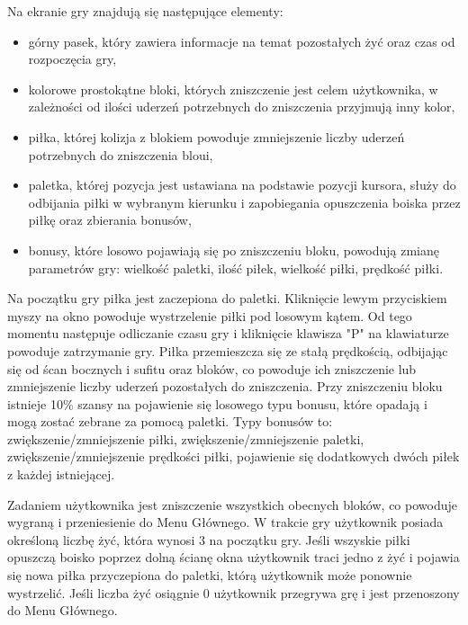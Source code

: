 \documentclass[a4paper]{article}
\begin{document}
Na ekranie gry znajdują się następujące elementy:
\begin{itemize}
\item górny pasek, który zawiera informacje na temat pozostałych żyć oraz czas od rozpoczęcia gry,
\item kolorowe prostokątne bloki, których zniszczenie jest celem użytkownika, w zależności od ilości uderzeń potrzebnych do zniszczenia przyjmują inny kolor,
\item piłka, której kolizja z blokiem powoduje zmniejszenie liczby uderzeń potrzebnych do zniszczenia bloui,
\item paletka, której pozycja jest ustawiana na podstawie pozycji kursora, służy do odbijania piłki w wybranym kierunku i zapobiegania opuszczenia boiska przez piłkę oraz zbierania bonusów,
\item bonusy, które losowo pojawiają się po zniszczeniu bloku, powodują zmianę parametrów gry: wielkość paletki, ilość piłek, wielkość piłki, prędkość piłki.
\end{itemize}

Na początku gry piłka jest zaczepiona do paletki. Kliknięcie lewym przyciskiem myszy na okno powoduje wystrzelenie piłki pod losowym kątem. Od tego momentu następuje odliczanie czasu gry i kliknięcie klawisza "P" na klawiaturze powoduje zatrzymanie gry. 
Piłka przemieszcza się ze stałą prędkością, odbijając się od ścan bocznych i sufitu oraz bloków, co powoduje ich zniszczenie lub zmniejszenie liczby uderzeń pozostałych do zniszczenia.
Przy zniszczeniu bloku istnieje 10\% szansy na pojawienie się losowego typu bonusu, które opadają i mogą zostać zebrane za pomocą paletki. Typy bonusów to: zwiększenie/zmniejszenie piłki, zwiększenie/zmniejszenie paletki, zwiększenie/zmniejszenie prędkości piłki, pojawienie się dodatkowych dwóch piłek z każdej istniejącej.

Zadaniem użytkownika jest zniszczenie wszystkich obecnych bloków, co powoduje wygraną i przeniesienie do Menu Głównego. W trakcie gry użytkownik posiada określoną liczbę żyć, która wynosi 3 na początku gry. Jeśli wszyskie piłki opuszczą boisko poprzez dolną ścianę okna użytkownik traci jedno z żyć i pojawia się nowa piłka przyczepiona do paletki, którą użytkownik może ponownie wystrzelić. Jeśli liczba żyć  osiągnie 0 użytkownik przegrywa grę i jest przenoszony do Menu Głównego.




\bigskip
\end{document}
